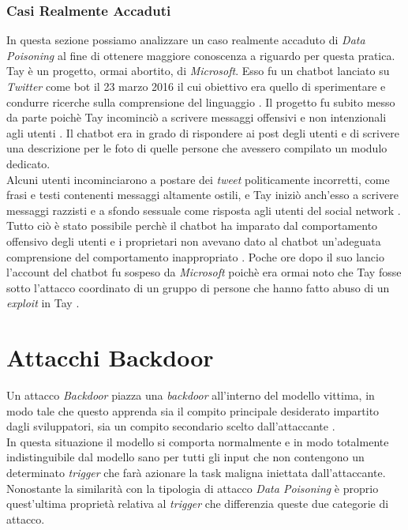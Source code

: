 \subsubsection{Casi Realmente Accaduti}
In questa sezione possiamo analizzare un caso realmente accaduto di \emph{Data Poisoning} al fine di ottenere maggiore conoscenza a riguardo per questa pratica.\\
Tay \cite{wikipedia2024taychatbot} \`e un progetto, ormai abortito, di \emph{Microsoft}. Esso fu un chatbot lanciato su \emph{Twitter} come bot il 23 marzo 2016 il cui obiettivo era quello di sperimentare e condurre ricerche sulla comprensione del linguaggio \cite{microsoft2016tay}. Il progetto fu subito messo da parte poich\`e Tay incominci\`o a scrivere messaggi offensivi e non intenzionali agli utenti \cite{microsoft2016learningfromtaysintroduction}.
Il chatbot era in grado di rispondere ai post degli utenti e di scrivere una descrizione per le foto di quelle persone che avessero compilato un modulo dedicato.\\
Alcuni utenti incominciarono a postare dei \emph{tweet} politicamente incorretti, come frasi e testi contenenti messaggi altamente ostili, e Tay inizi\`o anch'esso a scrivere messaggi razzisti e a sfondo sessuale come risposta agli utenti del social network \cite{wikipedia2024taychatbot}. Tutto ci\`o \`e stato possibile perch\`e il chatbot ha imparato dal comportamento offensivo degli utenti e i proprietari non avevano dato al chatbot un'adeguata comprensione del comportamento inappropriato \cite{wikipedia2024taychatbot}.
Poche ore dopo il suo lancio l'account del chatbot fu sospeso da \emph{Microsoft} poich\`e era ormai noto che Tay fosse sotto l'attacco coordinato di un gruppo di persone che hanno fatto abuso di un \emph{exploit} in Tay \cite{microsoft2016learningfromtaysintroduction}.

\section{Attacchi Backdoor}
Un attacco \emph{Backdoor} piazza una \emph{backdoor} all'interno del modello vittima, in modo tale che questo apprenda sia il compito principale desiderato impartito dagli sviluppatori, sia un compito secondario scelto dall'attaccante \cite{gao2020backdoorattackscountermeasuresdeep}.\\
In questa situazione il modello si comporta normalmente e in modo totalmente indistinguibile dal modello sano per tutti gli input che non contengono un determinato \emph{trigger} che far\`a azionare la task maligna iniettata dall'attaccante.\\
Nonostante la similarit\`a con la tipologia di attacco \emph{Data Poisoning} \`e proprio quest'ultima propriet\`a relativa al \emph{trigger} che differenzia queste due categorie di attacco.

